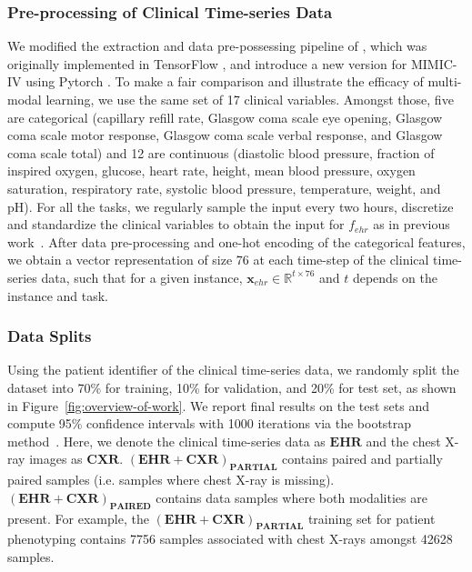 \documentclass[pmlr]{jmlr}
\begin{document}
\subsubsection{Pre-processing of Clinical Time-series Data}
We modified the extraction and data pre-possessing pipeline of \cite{benchhmark}, which was originally implemented in TensorFlow \citep{tensorflow2015}, and introduce a new version for MIMIC-IV using Pytorch \citep{NEURIPS2019_9015}. To make a fair comparison and illustrate the efficacy of multi-modal learning, we use the same set of 17 clinical variables. Amongst those, five are categorical (capillary refill rate, Glasgow coma scale eye opening, Glasgow coma scale motor response, Glasgow coma scale verbal response, and Glasgow coma scale total) and 12 are continuous (diastolic blood pressure, fraction of inspired oxygen, glucose,  heart rate, height, mean blood pressure, oxygen saturation, respiratory rate, systolic blood pressure, temperature, weight, and pH). For all the tasks, we regularly sample the input every two hours, discretize and standardize the clinical variables to obtain the input for $f_{ehr}$ as in previous work~\citep{benchhmark}. After data pre-processing and one-hot encoding of the categorical features, we obtain a vector representation of size 76 at each time-step of the clinical time-series data, such that for a given instance, $\mathbf{x}_{ehr}\in\mathbb{R}^{t\times76}$ and $t$ depends on the instance and task.



\subsubsection{Data Splits}
Using the patient identifier of the clinical time-series data, we randomly split the dataset into 70\% for training, 10\% for validation, and 20\% for test set, as shown in Figure~\ref{fig:overview-of-work}. We report final results on the test sets and compute 95\% confidence intervals with 1000 iterations via the bootstrap method~\citep{efron1994introduction}. Here, we denote the clinical time-series data as $\mathbf{EHR}$ and the chest X-ray images as $\mathbf{CXR}$.  $(\mathbf{EHR}+\mathbf{CXR})_\mathbf{PARTIAL}$ contains paired and partially paired samples (i.e. samples where chest X-ray is missing). $(\mathbf{EHR}+\mathbf{CXR})_\mathbf{PAIRED}$ contains data samples where both modalities are present. For example, the $(\mathbf{EHR}+\mathbf{CXR})_\mathbf{PARTIAL}$ training set for patient phenotyping contains 7756 samples associated with chest X-rays amongst 42628 samples.  
\end{document}
